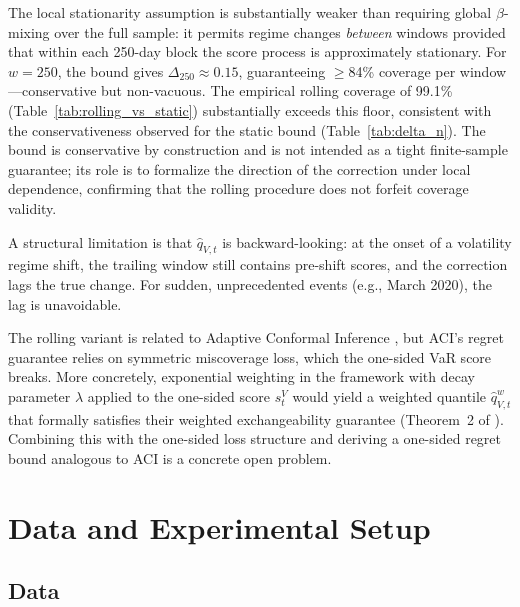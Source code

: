 \documentclass[preprint,11pt,authoryear]{elsarticle}
\newcommand{\1}{\boldsymbol{1}}
\begin{document}
	The local stationarity assumption is substantially weaker than
	requiring global $\beta$-mixing over the full sample: it permits
	regime changes \emph{between} windows provided that within each
	250-day block the score process is approximately stationary.
	For $w = 250$, the bound gives $\Delta_{250} \approx 0.15$,
	guaranteeing $\geq$84\% coverage per window---conservative but
	non-vacuous. The empirical rolling coverage of 99.1\%
	(Table~\ref{tab:rolling_vs_static}) substantially exceeds this
	floor, consistent with the conservativeness observed for the
	static bound (Table~\ref{tab:delta_n}).
	The bound is conservative by construction and is not intended as a tight finite-sample guarantee; its role is to formalize the direction of the correction under local dependence, confirming that the rolling procedure does not forfeit coverage validity.

	A structural limitation is that $\hat{q}_{V,t}$ is
	backward-looking: at the onset of a volatility regime
	shift, the trailing window still contains pre-shift
	scores, and the correction lags the true change.
	For sudden, unprecedented
	events (e.g., March 2020), the lag is unavoidable.

	The rolling variant is related to Adaptive Conformal
	Inference \citep{gibbs2021adaptive}, but ACI's regret
	guarantee relies on symmetric miscoverage loss, which the
	one-sided VaR score breaks. More concretely, exponential
	weighting in the \citet{barber2023conformal} framework with
	decay parameter $\lambda$ applied to the one-sided score
	$s_t^V$ would yield a weighted quantile
	$\hat{q}_{V,t}^{w}$ that formally satisfies their weighted
	exchangeability guarantee (Theorem~2 of
	\citealt{barber2023conformal}). Combining this with the
	one-sided loss structure and deriving a one-sided regret
	bound analogous to ACI is a concrete open problem.
	
	\section{Data and Experimental Setup}
	\label{sec:data}
	
	\subsection{Data}
	
\end{document}
